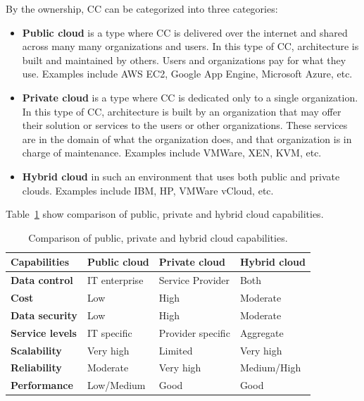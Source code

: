 By the ownership, CC can be categorized into three categories:

\begin{itemize}
	\item \textbf{Public cloud} is a type where CC is delivered over the internet and shared across many many organizations and users. In this type of CC, architecture is built and maintained by others. Users and organizations pay for what they use. Examples include AWS EC2, Google App Engine, Microsoft Azure, etc.
	\item \textbf{Private cloud} is a type where CC is dedicated only to a single organization. In this type of CC, architecture is built by an organization that may offer their solution or services to the users or other organizations. These services are in the domain of what the organization does, and that organization is in charge of maintenance. Examples include VMWare, XEN, KVM, etc.
	\item \textbf{Hybrid cloud} in such an environment that uses both public and private clouds. Examples include IBM, HP, VMWare vCloud, etc.
\end{itemize}

\noindent
Table~\ref{tab:table4} show comparison of public, private and hybrid cloud capabilities.\label{sec_types}

\begin{table}[h!]
	\begin{center}
		\begin{tabular}{l|l|l|l}
			\textbf{Capabilities} & \textbf{Public cloud} & \textbf{Private cloud} & \textbf{Hybrid cloud}\\
			\hline
			\textbf{Data control} & IT enterprise & Service Provider & Both \\
			\textbf{Cost} & Low & High & Moderate \\
			\textbf{Data security} & Low & High & Moderate \\
			\textbf{Service levels} & IT specific & Provider specific & Aggregate \\
			\textbf{Scalability} & Very high & Limited & Very high \\	
			\textbf{Reliability} & Moderate & Very high & Medium/High\\	
			\textbf{Performance} & Low/Medium & Good & Good \\
\end{tabular}
	\end{center}
	\vspace{-0.5cm}
	\caption{Comparison of public, private and hybrid cloud capabilities.}
	\label{tab:table4}
\end{table}

